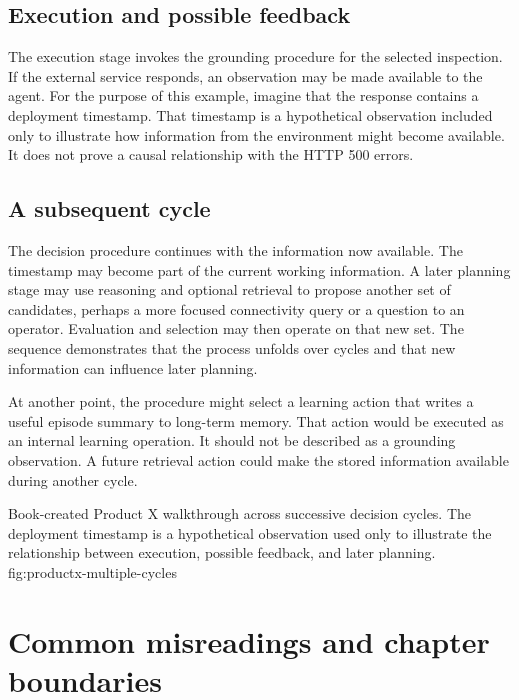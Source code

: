\subsection{Execution and possible feedback}

The execution stage invokes the grounding procedure for the selected inspection. If the external service responds, an observation may be made available to the agent. For the purpose of this example, imagine that the response contains a deployment timestamp. That timestamp is a hypothetical observation included only to illustrate how information from the environment might become available. It does not prove a causal relationship with the HTTP 500 errors.

\subsection{A subsequent cycle}

The decision procedure continues with the information now available. The timestamp may become part of the current working information. A later planning stage may use reasoning and optional retrieval to propose another set of candidates, perhaps a more focused connectivity query or a question to an operator. Evaluation and selection may then operate on that new set. The sequence demonstrates that the process unfolds over cycles and that new information can influence later planning.

At another point, the procedure might select a learning action that writes a useful episode summary to long-term memory. That action would be executed as an internal learning operation. It should not be described as a grounding observation. A future retrieval action could make the stored information available during another cycle.

  {Book-created Product X walkthrough across successive decision cycles. The deployment timestamp is a hypothetical observation used only to illustrate the relationship between execution, possible feedback, and later planning.}
  {fig:productx-multiple-cycles}

\section{Common misreadings and chapter boundaries}
\label{sec:complete-process-boundaries}

